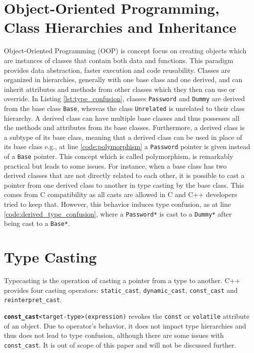 \documentclass[a4paper,11pt,oneside]{report}
\begin{document}
\section{Object-Oriented Programming, Class Hierarchies and Inheritance}
\label{sec:cpp_oop} Object-Oriented Programming (OOP) is \a concept focus on creating objects
which are instances of classes that contain both data and functions. This
paradigm provides data abstraction, faster execution and code reusability.
Classes are organized in hierarchies, generally with one base class and one
derived, and can inherit attributes and methods from other classes which
they then can use or override. In Listing \autoref{lst:type_confusion}, classes
\texttt{Password} and \texttt{Dummy} are derived from the base class
\texttt{Base}, whereas the class \texttt{Unrelated} is unrelated to their class
hierarchy.  A derived class can have multiple base classes and thus possesses
all the methods and attributes from its base classes.  Furthermore, a derived
class is a subtype of its base class, meaning that a derived class can be used
in place of its base class e.g., at line \ref{code:polymorphism} a
\texttt{Password} pointer is given instead of a \texttt{Base} pointer. This
concept which is called polymorphism, is remarkably practical but leads to some
issues. For instance, when a base class has two derived classes that are not
directly related to each other, it is possible to cast a pointer from one
derived class to another in type casting by the base class. This comes from 
C compatibility as all casts are allowed in C and C++ developers tried 
to keep that. However, this behavior induces type
confusion, as at line \ref{code:derived_type_confusion}, where a
\texttt{Password*} is cast to a \texttt{Dummy*} after being cast to a
\texttt{Base*}. 

\section{Type Casting} \label{sec:cpp_type_casting} Typecasting is the operation
of casting a pointer from a type to another. C++ provides four casting
operators: \texttt{static\_cast}, \texttt{dynamic\_cast}, \texttt{const\_cast}
and \texttt{reinterpret\_cast}. 

\texttt{\textbf{const\_cast}<target-type>(expression)} revokes the \texttt{const} or
\texttt{volatile} attribute of an object. Due to operator's behavior, it does not impact type
hierarchies and thus does not lead to type confusion, although there are some
issues with \texttt{const\_cast}. It is out of scope of this paper and will not 
be discussed further.
\end{document}
